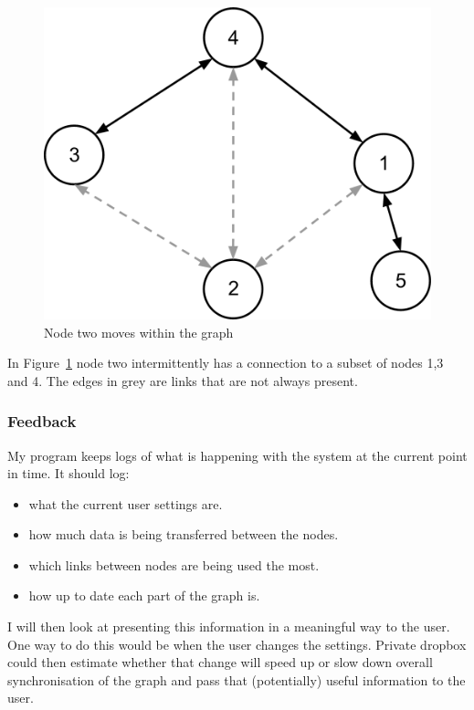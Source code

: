 \documentclass[12pt]{article}
\begin{document}
\begin{figure}[htp]
    \centering
    \includegraphics[scale=0.5]{images/mobile-node.png}
    \caption{Node two moves within the graph}
    \label{fig:mobile_node}
\end{figure}

In Figure~\ref{fig:mobile_node} node two intermittently has a 
connection to a subset of
nodes 1,3 and 4. The edges in grey are links that
are not always present.

\subsubsection{Feedback}
\label{sec:feedback}
My program keeps logs of what is happening with
the system at the current point in time. 
It should log:
\begin{itemize}
    \item what the current user settings are.
    \item how much data is being transferred between the nodes.
    \item which links between nodes are being used the most.
    \item how up to date each part of the graph is.
\end{itemize}

I will then look at presenting this information
in a meaningful way to the user.
One way to do this would be when the user changes the
settings. Private dropbox could then estimate whether that
change will speed up or slow down overall synchronisation
of the graph and pass that (potentially) useful information
to the user.
\end{document}
